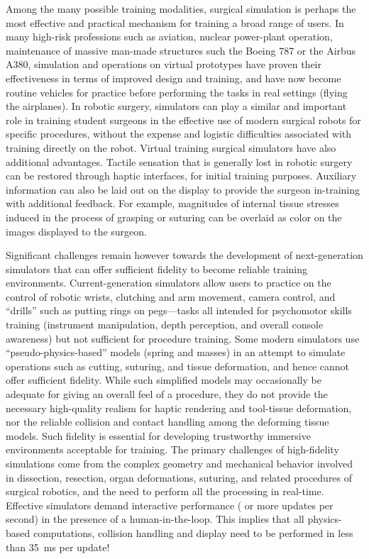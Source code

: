 Among the many possible training modalities, surgical simulation is perhaps the most effective and practical mechanism for training a broad range of users. In many high-risk professions such as aviation, nuclear power-plant operation, maintenance of massive man-made structures such the Boeing 787 or the Airbus A380, simulation and operations on virtual prototypes have proven their effectiveness in terms of improved design and training, and have now become routine vehicles for practice before performing the tasks in real settings (\eg flying the airplanes). In robotic surgery, simulators can play a similar and important role in training student surgeons in the effective use of modern surgical robots for specific procedures, without the expense and logistic difficulties associated with training directly on the robot. Virtual training surgical simulators have also additional advantages. Tactile sensation that is generally lost in robotic surgery can be restored through haptic interfaces, for initial training purposes. Auxiliary information can also be laid out on the display to provide the surgeon in-training with additional feedback. For example, magnitudes of internal tissue stresses induced in the process of grasping or suturing can be overlaid as color on the images displayed to the surgeon.

Significant challenges remain however towards the development of next-generation simulators that can offer sufficient fidelity to become reliable training environments. Current-generation simulators allow users to practice on the control of robotic wrists, clutching and arm movement, camera control, and \enquote{drills} such as putting rings on pegs---tasks all intended for psychomotor skills training (instrument manipulation, depth perception, and overall console awareness) but not sufficient for procedure training. Some modern simulators use \enquote{pseudo-physics-based} models (spring and masses) in an attempt to simulate operations such as cutting, suturing, and tissue deformation, and hence cannot offer sufficient fidelity. While such simplified models may occasionally be adequate for giving an overall feel of a procedure, they do not provide the necessary high-quality realism for haptic rendering and tool-tissue deformation, nor the reliable collision and contact handling among the deforming tissue models. Such fidelity is essential for developing trustworthy immersive environments acceptable for training. The primary challenges of high-fidelity simulations come from the complex geometry and mechanical behavior involved in dissection, resection, organ deformations, suturing, and related procedures of surgical robotics, and the need to perform all the processing in real-time. Effective simulators demand interactive performance ( or more updates per second) in the presence of a human-in-the-loop. This implies that all physics-based computations, collision handling and display need to be performed in less than \SI{35}{\milli\second} per update!

